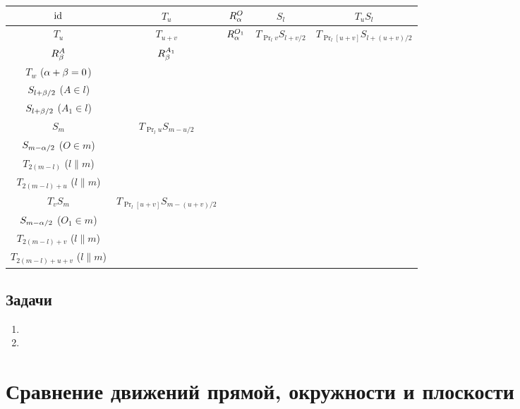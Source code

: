 \begin{enumerate}
\renewcommand{\arraystretch}{1.8}\renewcommand{\tabcolsep}{1mm}
\begin{table}[h!]\tiny
\begin{tabular}{c|c|c|c|c|}
$\mathrm{id}$  &  $T_u$      &   $R_\alpha^O$   &   $S_l$   & $T_uS_l$  \\
\hline
$T_u$  &  $T_{u+v}$  &   $R_\alpha^{O_1}$ & $T_{\Pr_lv}S_{l+v/2}$ & $T_{\Pr_l[u+v]}S_{l+(u+v)/2}$ \\ \hline 
$R_\beta^A$ & $R_\beta^{A_1}$ & \specialcell{$R_{\al+\be}^C$ ($\al+\be\ne 0$) \\ $T_w$ ($\alpha+\beta=0$)} & \specialcell{$T_wS_{l+\be/2}$ ($A\notin l$) \\ $S_{l+\beta/2}$ ($A\in l$)} & \specialcell{$T_wS_{l+\be/2}$ ($A_1\notin l$) \\ $S_{l+\beta/2}$ ($A_1\in l$)} \\ \hline 
$S_m$ & $T_{\Pr_lu}S_{m-u/2} $ & \specialcell{$T_wS_{m-\al/2}$ ($O\notin m$) \\ $S_{m-\alpha/2}$ ($O\in m$)} &
\specialcell{$R_{2\angle lm}^{l\cap m}$ ($l\not\parallel m$) \\ $T_{2(m-l)}$ ($l\parallel m$)} & 
\specialcell{$R_{2\angle lm}^O$ ($l\not\parallel m$) \\ $T_{2(m-l)+u}$ ($l\parallel m$)} \\ \hline 
$T_vS_m$ & $T_{\Pr_l[u+v]}S_{m-(u+v)/2}$ & \specialcell{$T_wS_{m-\al/2}$ ($O_1\notin m$) \\ $S_{m-\alpha/2}$ ($O_1\in m$)} &
\specialcell{$R_{2\angle lm}^O$ ($l\not\parallel m$) \\ $T_{2(m-l)+v}$ ($l\parallel m$)} &
\specialcell{$R_{2\angle lm}^O$ ($l\not\parallel m$) \\ $T_{2(m-l)+u+v}$ ($l\parallel m$)} \\ \hline
\end{tabular}
\end{table}




\end{enumerate}


\subsection*{Задачи}
\begin{enumerate}
\item 
\item 
\end{enumerate}


\section{Сравнение движений прямой, окружности и плоскости}
